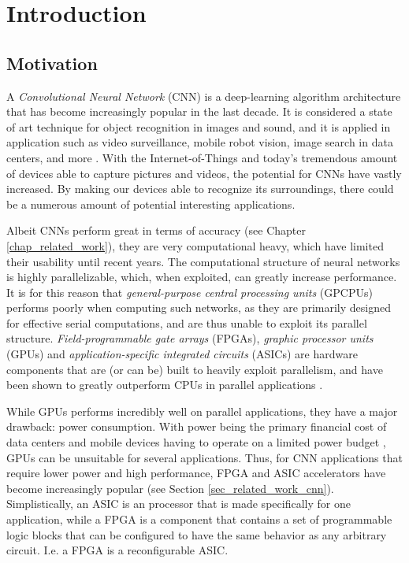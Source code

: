\chapter{Introduction}

\section{Motivation}

A \textit{Convolutional Neural Network} (CNN) is a deep-learning algorithm architecture that has become increasingly popular in the last decade. It is considered a state of art technique for object recognition in images and sound, and it is applied in application such as video surveillance, mobile robot vision, image search in data centers, and more \cite{Zhang2015} \cite{Farabet2009} \cite{Ji2013} \cite{Ovtcharov2015}. With the Internet-of-Things and today's tremendous amount of devices able to capture pictures and videos, the potential for CNNs have vastly increased. By making our devices able to recognize its surroundings, there could be a numerous amount of potential interesting applications.

Albeit CNNs perform great in terms of accuracy (see Chapter \ref{chap_related_work}), they are very computational heavy, which have limited their usability until recent years. The computational structure of neural networks is highly parallelizable, which, when exploited, can greatly increase performance. It is for this reason that \textit{general-purpose central processing units} (GPCPUs) performs poorly when computing such networks, as they are primarily designed for effective serial computations, and are thus unable to exploit its parallel structure. \textit{Field-programmable gate arrays} (FPGAs), \textit{graphic processor units} (GPUs) and \textit{application-specific integrated circuits} (ASICs) are hardware components that are (or can be) built to heavily exploit parallelism, and have been shown to greatly outperform CPUs in parallel applications \cite{Chung2010}.

While GPUs performs incredibly well on parallel applications, they have a major drawback: power consumption. With power being the primary financial cost of data centers and mobile devices having to operate on a limited power budget \cite{Duranton2013}, GPUs can be unsuitable for several applications. Thus, for CNN applications that require lower power and high performance, FPGA and ASIC accelerators have become increasingly popular (see Section \ref{sec_related_work_cnn}). Simplistically, an ASIC is an processor that is made specifically for one application,  while a FPGA is a component that contains a set of programmable logic blocks that can be configured to have the same behavior as any arbitrary circuit. I.e. a FPGA is a reconfigurable ASIC. 

